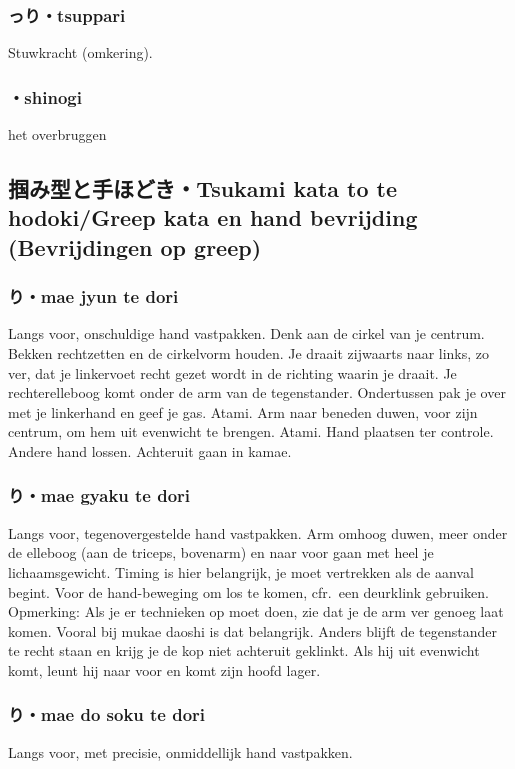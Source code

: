 \subsubsection{っり・tsuppari}
Stuwkracht (omkering).

\subsubsection{・shinogi}
het overbruggen

\subsection{掴み型と手ほどき・Tsukami kata to te hodoki/Greep kata en hand bevrijding (Bevrijdingen op greep)}
\subsubsection{り・mae jyun te dori}
Langs voor, onschuldige hand vastpakken. Denk aan de cirkel van je centrum. Bekken rechtzetten en de cirkelvorm houden.
Je draait zijwaarts naar links, zo ver, dat je linkervoet recht gezet wordt in de richting waarin je draait. Je rechterelleboog komt onder de arm van de tegenstander. Ondertussen pak je over met je linkerhand en geef je gas. Atami. Arm naar beneden duwen, voor zijn centrum, om hem uit evenwicht te brengen. Atami. Hand plaatsen ter controle. Andere hand lossen. Achteruit gaan in kamae.

\subsubsection{り・mae gyaku te dori}
Langs voor, tegenovergestelde hand vastpakken. Arm omhoog duwen, meer onder de elleboog (aan de triceps, bovenarm) en naar voor gaan met heel je lichaamsgewicht. Timing is hier belangrijk, je moet vertrekken als de aanval begint. Voor de hand-beweging om los te komen, cfr.\ een deurklink gebruiken.\\
Opmerking: Als je er technieken op moet doen, zie dat je de arm ver genoeg laat komen. Vooral bij mukae daoshi is dat belangrijk. Anders blijft de tegenstander te recht staan en krijg je de kop niet achteruit geklinkt. Als hij uit evenwicht komt, leunt hij naar voor en komt zijn hoofd lager.

\subsubsection{り・mae do soku te dori}
Langs voor, met precisie, onmiddellijk hand vastpakken.


